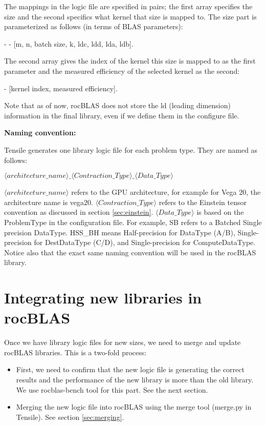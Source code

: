 \documentclass[]{article}
\begin{document}
The mappings in the logic file are specified in pairs; the first array specifies the size and the second specifics what kernel that size is mapped to. The size part is parameterized as follows (in terms of BLAS parameters):

\begin{center}
 	- - [m, n, batch size, k, ldc, ldd, lda, ldb].
\end{center}
\noindent
The second array gives the index of the kernel this size is mapped to as the first parameter and the measured efficiency of the selected kernel as the second:

\begin{center}
	- [kernel index, measured efficiency].
\end{center}

\noindent
Note that as of now, rocBLAS does not store the ld (leading dimension) information in the final library, even if we define them in the configure file.

\bigskip
\noindent

\textbf{\large{Naming convention:}}

\label{sec:naming}
\noindent
Tensile generates one library logic file for each problem type. They are named as follows:
\begin{center}
	$\langle architecture\_name \rangle \_\langle Contraction\_Type \rangle\_ \langle Data\_Type \rangle$
\end{center}

\noindent
$\langle architecture\_name \rangle$ refers to the GPU architecture, for example for Vega 20, the architecture name is vega20. $\langle Contraction\_Type \rangle$ refers to the Einstein tensor convention as discussed in section \ref{sec:einstein}. $\langle Data\_Type \rangle$ is based on the ProblemType in the configuration file. For example, SB refers to a Batched Single precision DataType. HSS\_BH means Half-precision for DataType (A/B), Single-precision for DestDataType (C/D), and Single-precision for ComputeDataType. Notice also that the exact same naming convention will be used in the rocBLAS library.

\section{Integrating new libraries in rocBLAS}
Once we have library logic files for new sizes, we need to merge and update rocBLAS libraries. This is a two-fold process: 
\begin{itemize}
\item First, we need to confirm that the new logic file is generating the correct results and the performance of the new library is more than the old library. We use rocblas-bench tool for this part. See the next section. 
\item Merging the new logic file into rocBLAS using the merge tool (merge.py in Tensile). See section \ref{sec:merging}.
\end{itemize}
\end{document}
